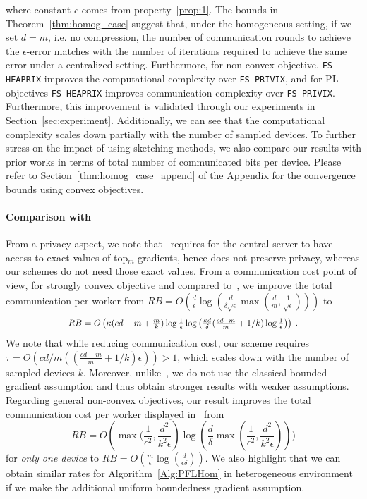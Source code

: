 \documentclass[sigconf, anonymous, review]{acmart}
\newcommand*{\Resize}[2]{\resizebox{#1}{!}{$#2$}}%
\begin{document}
where constant $c$ comes from property~\ref{prop:1}. The bounds in Theorem~\ref{thm:homog_case} suggest that, under the homogeneous setting, if we set $d=m$, i.e. no compression, the number of communication rounds to achieve the $\epsilon$-error matches with the number of iterations required to achieve the same error under a centralized setting. 
Furthermore, for non-convex objective, \texttt{FS-HEAPRIX} improves the computational complexity over \texttt{FS-PRIVIX}, and for PL objectives \texttt{FS-HEAPRIX} improves communication complexity over \texttt{FS-PRIVIX}. Furthermore, this improvement is validated through our experiments in Section~\ref{sec:experiment}.   
Additionally, we can see that the computational complexity scales down partially with the number of sampled devices. 
To further stress on the impact of using sketching methods, we also compare our results with prior works in terms of total number of communicated bits per device. 
Please refer to Section~\ref{thm:homog_case_append} of the Appendix for the convergence bounds using convex objectives.

\paragraph{Comparison with~\citep{ivkin2019communication}}
From a privacy aspect, we note that~\citep{ivkin2019communication} requires for the central server to have access to exact values of top$_m$ gradients, hence does not preserve privacy, whereas our schemes do not need those exact values. 
From a communication cost point of view, for strongly convex objective and compared to~\citep{ivkin2019communication}, we improve the total communication per worker from 
$RB=O\left(\frac{ d}{\epsilon}\log\left(\frac{d}{\delta\sqrt{\epsilon}}\max\left(\frac{ d}{m},\frac{1}{\sqrt{\epsilon}}\right)\right)\right)$ to 
\[ \Resize{8cm}{RB=O\left(\kappa(cd-m+\frac{m}{k})\log\frac{1}{\epsilon}\log\left(\frac{\kappa d}{\delta}(\frac{cd-m}{m}+1/k)\log\frac{1}{\epsilon}\right)\right)}\ .\]
We note that while reducing communication cost, our scheme requires $\tau=O(cd/m((\frac{ cd-m}{m}+1/k)\epsilon))>1$, which scales down with the number of sampled devices $k$. 
Moreover, unlike~\citep{ivkin2019communication}, we do not use the classical bounded gradient assumption and thus obtain stronger results with weaker assumptions. 
Regarding general non-convex objectives, our result improves the total communication cost per worker displayed in~\citep{ivkin2019communication} from $$RB=O\left(\max(\frac{1}{\epsilon^2},\frac{d^2}{k^2\epsilon}\right)\log(\frac{d}{\delta}\max(\frac{1}{\epsilon^2},\frac{d^2}{k^2\epsilon})))$$ for \emph{only one device} to $RB=O(\frac{m}{\epsilon}\log(\frac{d}{\epsilon\delta}))$. 
We also highlight that we can obtain similar rates for Algorithm~\ref{Alg:PFLHom} in heterogeneous environment if we make the additional uniform boundedness gradient assumption.
\end{document}
